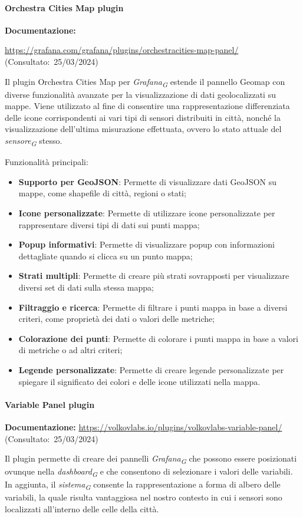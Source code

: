 \paragraph{Orchestra Cities Map plugin}
\textbf{Documentazione:}

\url{https://grafana.com/grafana/plugins/orchestracities-map-panel/} (Consultato:~25/03/2024)

Il plugin Orchestra Cities Map per \textit{Grafana}\textsubscript{\textit{G}} estende il pannello Geomap con diverse funzionalità avanzate per la visualizzazione di dati geolocalizzati su mappe.
Viene utilizzato al fine di consentire una rappresentazione differenziata delle icone corrispondenti ai vari tipi di sensori distribuiti in città, nonché la visualizzazione dell'ultima misurazione effettuata, ovvero lo stato attuale del \textit{sensore}\textsubscript{\textit{G}} stesso.

Funzionalità principali:
\begin{itemize}
    \item \textbf{Supporto per GeoJSON}: Permette di visualizzare dati GeoJSON su mappe, come shapefile di città, regioni o stati;
    \item \textbf{Icone personalizzate}: Permette di utilizzare icone personalizzate per rappresentare diversi tipi di dati sui punti mappa;
    \item \textbf{Popup informativi}: Permette di visualizzare popup con informazioni dettagliate quando si clicca su un punto mappa;
    \item \textbf{Strati multipli}: Permette di creare più strati sovrapposti per visualizzare diversi set di dati sulla stessa mappa;
    \item \textbf{Filtraggio e ricerca}: Permette di filtrare i punti mappa in base a diversi criteri, come proprietà dei dati o valori delle metriche;
    \item \textbf{Colorazione dei punti}: Permette di colorare i punti mappa in base a valori di metriche o ad altri criteri;
    \item \textbf{Legende personalizzate}: Permette di creare legende personalizzate per spiegare il significato dei colori e delle icone utilizzati nella mappa.
\end{itemize}

\paragraph{Variable Panel plugin}
\textbf{Documentazione:}
\url{https://volkovlabs.io/plugins/volkovlabs-variable-panel/} (Consultato:~25/03/2024)


Il plugin permette di creare dei pannelli \textit{Grafana}\textsubscript{\textit{G}} che possono essere posizionati ovunque nella \textit{dashboard}\textsubscript{\textit{G}} e che consentono di selezionare i valori delle variabili.
In aggiunta, il \textit{sistema}\textsubscript{\textit{G}} consente la rappresentazione a forma di albero delle variabili, la quale risulta vantaggiosa nel nostro contesto in cui i sensori sono localizzati all'interno delle celle della città.


